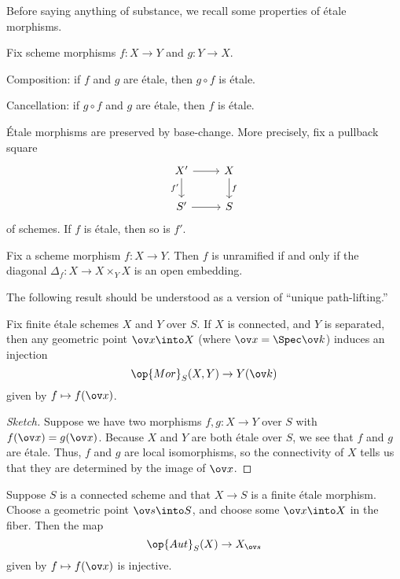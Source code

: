 \documentclass[../notes.tex]{subfiles}
\begin{document}
Before saying anything of substance, we recall some properties of \'etale morphisms.
\begin{lemma}
	Fix scheme morphisms $f\colon X\to Y$ and $g\colon Y\to X$.
	\begin{listalph}
		\item Composition: if $f$ and $g$ are \'etale, then $g\circ f$ is \'etale.
		\item Cancellation: if $g\circ f$ and $g$ are \'etale, then $f$ is \'etale.
	\end{listalph}
\end{lemma}
\begin{lemma}
	\'Etale morphisms are preserved by base-change. More precisely, fix a pullback square
	\[\begin{tikzcd}
		{X'} & X \\
		{S'} & S
		\arrow[from=1-1, to=1-2]
		\arrow["{f'}"', from=1-1, to=2-1]
		\arrow["f", from=1-2, to=2-2]
		\arrow[from=2-1, to=2-2]
	\end{tikzcd}\]
	of schemes. If $f$ is \'etale, then so is $f'$.
\end{lemma}
\begin{lemma}
	Fix a scheme morphism $f\colon X\to Y$. Then $f$ is unramified if and only if the diagonal $\Delta_f\colon X\to X\times_YX$ is an open embedding.
\end{lemma}
The following result should be understood as a version of ``unique path-lifting.''
\begin{proposition}[Rigidity] \label{prop:rigidity-of-etale}
	Fix finite \'etale schemes $X$ and $Y$ over $S$. If $X$ is connected, and $Y$ is separated, then any geometric point $\ov x\into X$ (where $\ov x=\Spec\ov k$) induces an injection
	\[\op{Mor}_S(X,Y)\to Y(\ov k)\]
	given by $f\mapsto f(\ov x)$.
\end{proposition}
\begin{proof}[Sketch]
	Suppose we have two morphisms $f,g\colon X\to Y$ over $S$ with $f(\ov x)=g(\ov x)$. Because $X$ and $Y$ are both \'etale over $S$, we see that $f$ and $g$ are \'etale. Thus, $f$ and $g$ are local isomorphisms, so the connectivity of $X$ tells us that they are determined by the image of $\ov x$.
\end{proof}
\begin{corollary}
	Suppose $S$ is a connected scheme and that $X\to S$ is a finite \'etale morphism. Choose a geometric point $\ov s\into S$, and choose some $\ov x\into X$ in the fiber. Then the map
	\[\op{Aut}_S(X)\to X_{\ov s}\]
	given by $f\mapsto f(\ov x)$ is injective.
\end{corollary}
\end{document}
